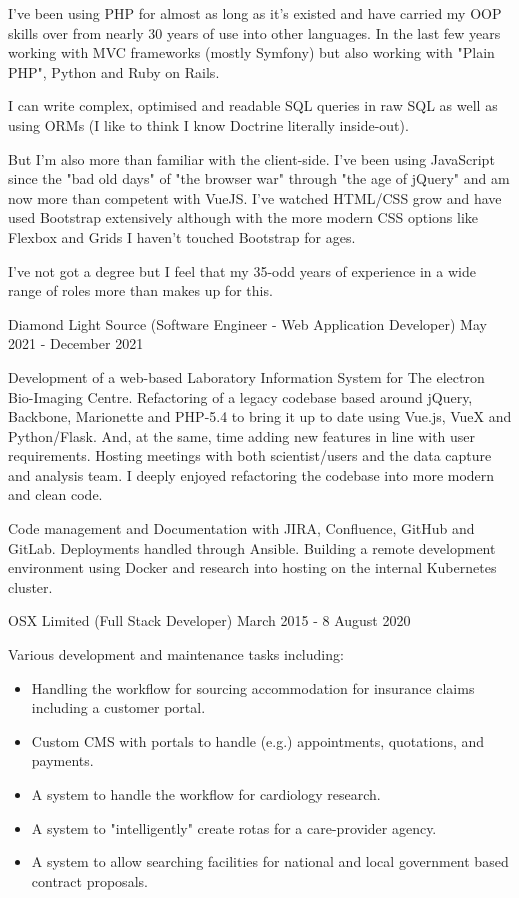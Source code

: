 \topHeading{}



I've been using PHP for almost as long as it's existed
and have carried my OOP skills over from nearly 30 years
of use into other languages.
In the last few years working with MVC frameworks (mostly Symfony)
but also working with "Plain PHP", Python and Ruby on Rails.

I can write complex, optimised and readable SQL queries in raw SQL as well
as using ORMs (I like to think I know Doctrine literally inside-out).

But I'm also more than familiar with the client-side. I've been using JavaScript
since the "bad old days" of "the browser war" through "the age of jQuery" and
am now more than competent with VueJS. I've watched HTML/CSS grow and have used
Bootstrap extensively although with the more modern CSS options like Flexbox
and Grids I haven't touched Bootstrap for ages.

I've not got a degree but I feel that my 35-odd years of experience in a wide
range of roles more than makes up for this.



\jobHeading
    {Diamond Light Source (Software Engineer - Web Application Developer)}
    {May 2021 - December 2021}

Development of a web-based Laboratory Information System for
The electron Bio-Imaging Centre. Refactoring of a legacy codebase based around
jQuery, Backbone, Marionette and PHP-5.4 to bring it up to date using Vue.js,
VueX and Python/Flask. And, at the same, time adding new features in line with
user requirements. Hosting meetings with both scientist/users and the data
capture and analysis team. I deeply enjoyed refactoring the codebase into
more modern and clean code.

Code management and Documentation with JIRA, Confluence, GitHub and GitLab.
Deployments handled through Ansible.
Building a remote development environment using Docker and research into
hosting on the internal Kubernetes cluster.

\jobHeading
    {OSX Limited (Full Stack Developer)}
    {March 2015 - 8 August 2020}

Various development and maintenance tasks including:
\begin{itemize}
    \item Handling the workflow for sourcing accommodation for insurance claims including a customer portal.
    \item Custom CMS with portals to handle (e.g.) appointments, quotations, and payments.
    \item A system to handle the workflow for cardiology research.
    \item A system to "intelligently" create rotas for a care-provider agency.
    \item A system to allow searching facilities for national and local government based contract proposals.
\end{itemize}

